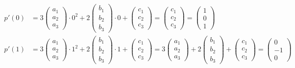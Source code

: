 \documentclass{article}
\begin{document}
        \begin{align}
            p'(0) &= 3 \left(\begin{matrix} a_1\\a_2\\a_3 \end{matrix}\right) \cdot 0^2 + 2 \left(\begin{matrix} b_1\\b_2\\b_3 \end{matrix}\right) \cdot 0
                + \left(\begin{matrix} c_1\\c_2\\c_3 \end{matrix}\right) = \left(\begin{matrix} c_1\\c_2\\c_3 \end{matrix}\right)
                = \left(\begin{matrix} 1\\0\\1 \end{matrix}\right)\\
            p'(1) &= 3 \left(\begin{matrix} a_1\\a_2\\a_3 \end{matrix}\right) \cdot 1^2 + 2 \left(\begin{matrix} b_1\\b_2\\b_3 \end{matrix}\right) \cdot 1
                + \left(\begin{matrix} c_1\\c_2\\c_3 \end{matrix}\right) 
                = 3 \left(\begin{matrix} a_1\\a_2\\a_3 \end{matrix}\right) + 2 \left(\begin{matrix} b_1\\b_2\\b_3 \end{matrix}\right)
                + \left(\begin{matrix} c_1\\c_2\\c_3 \end{matrix}\right) = \left(\begin{matrix} 0\\-1\\0 \end{matrix}\right)
        \end{align}
\end{document}
